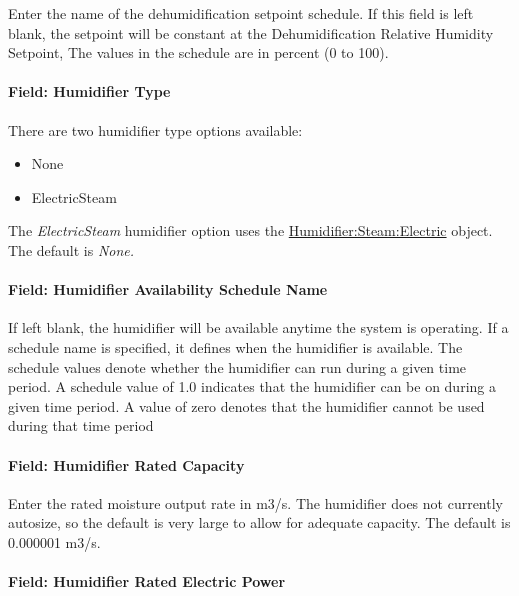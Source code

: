 Enter the name of the dehumidification setpoint schedule. If this field is left blank, the setpoint will be constant at the Dehumidification Relative Humidity Setpoint, The values in the schedule are in percent (0 to 100).

\paragraph{Field: Humidifier Type}\label{field-humidifier-type-5}

There are two humidifier type options available:

\begin{itemize}
\item
  None
\item
  ElectricSteam
\end{itemize}

The \emph{ElectricSteam} humidifier option uses the \hyperref[humidifiersteamelectric]{Humidifier:Steam:Electric} object. The default is \emph{None.}

\paragraph{Field: Humidifier Availability Schedule Name}\label{field-humidifier-availability-schedule-name-5}

If left blank, the humidifier will be available anytime the system is operating. If a schedule name is specified, it defines when the humidifier is available. The schedule values denote whether the humidifier can run during a given time period. A schedule value of 1.0 indicates that the humidifier can be on during a given time period. A value of zero denotes that the humidifier cannot be used during that time period

\paragraph{Field: Humidifier Rated Capacity}\label{field-humidifier-rated-capacity-5}

Enter the rated moisture output rate in m3/s. The humidifier does not currently autosize, so the default is very large to allow for adequate capacity. The default is 0.000001 m3/s.

\paragraph{Field: Humidifier Rated Electric Power}\label{field-humidifier-rated-electric-power-5}

